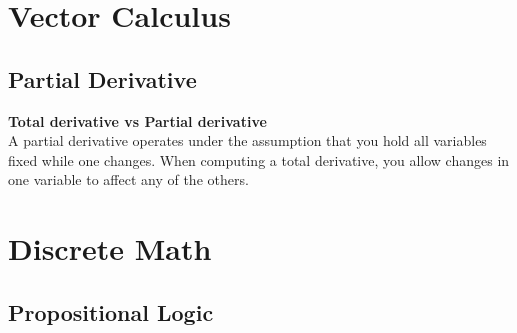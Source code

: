 \documentclass{article}
\numberwithin{theorem}{subsection}
\numberwithin{theorem}{subsubsection}
\theoremstyle{definition}
\numberwithin{definition}{subsection}
\numberwithin{definition}{subsubsection}
\begin{document}
\begin{comment}
======================================================================================================================================================================================================================================================================================VECTOR CALCULUS=================================================== ====================================================================================================================================================================================================================================
\end{comment}

\section{Vector Calculus}

\subsection{Partial Derivative}
\noindent \textbf{Total derivative vs Partial derivative}\\
A partial derivative  operates under the assumption that you hold all variables fixed while one changes. When computing a total derivative, you allow changes in one variable to affect any of the others.

\begin{comment}
======================================================================================================================================================================================================================================================================================DISCRETE MATH=================================================== ====================================================================================================================================================================================================================================
\end{comment}

\section{Discrete Math}

\subsection{Propositional Logic}
\end{document}

